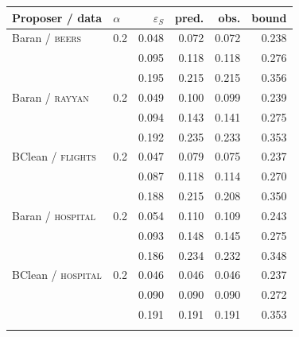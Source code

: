 \small
\setlength{\tabcolsep}{3.5pt}
\renewcommand{\arraystretch}{0.9}
\begin{tabular}{@{}llrrrr@{}}
\toprule
Proposer / data & $\alpha$ & $\varepsilon_S$ & pred. & obs. & bound \\
\midrule
Baran / \textsc{beers} & 0.2 & 0.048 & 0.072 & 0.072 & 0.238 \\
 &  & 0.095 & 0.118 & 0.118 & 0.276 \\
 &  & 0.195 & 0.215 & 0.215 & 0.356 \\
\addlinespace
Baran / \textsc{rayyan} & 0.2 & 0.049 & 0.100 & 0.099 & 0.239 \\
 &  & 0.094 & 0.143 & 0.141 & 0.275 \\
 &  & 0.192 & 0.235 & 0.233 & 0.353 \\
\addlinespace
BClean / \textsc{flights} & 0.2 & 0.047 & 0.079 & 0.075 & 0.237 \\
 &  & 0.087 & 0.118 & 0.114 & 0.270 \\
 &  & 0.188 & 0.215 & 0.208 & 0.350 \\
\addlinespace
Baran / \textsc{hospital} & 0.2 & 0.054 & 0.110 & 0.109 & 0.243 \\
 &  & 0.093 & 0.148 & 0.145 & 0.275 \\
 &  & 0.186 & 0.234 & 0.232 & 0.348 \\
\addlinespace
BClean / \textsc{hospital} & 0.2 & 0.046 & 0.046 & 0.046 & 0.237 \\
 &  & 0.090 & 0.090 & 0.090 & 0.272 \\
 &  & 0.191 & 0.191 & 0.191 & 0.353 \\
\addlinespace
\bottomrule
\end{tabular}
